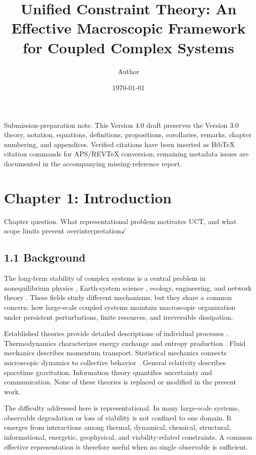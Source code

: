 \documentclass[aps,pre,reprint,superscriptaddress,nofootinbib]{revtex4-2}
\begin{document}
\title{Unified Constraint Theory: An Effective Macroscopic Framework for Coupled Complex Systems}
\author{Author}
\date{\today}
\maketitle

Submission-preparation note. This Version 4.0 draft preserves the Version 3.0 theory, notation, equations, definitions, propositions, corollaries, remarks, chapter numbering, and appendices. Verified citations have been inserted as BibTeX citation commands for APS/REVTeX conversion; remaining metadata issues are documented in the accompanying missing-reference report.

\section{Chapter 1: Introduction}

Chapter question. What representational problem motivates UCT, and what scope limits prevent overinterpretation$\checkmark$

\subsection{1.1 Background}

The long-term stability of complex systems is a central problem in nonequilibrium physics \cite{NicolisPrigogine1977,Haken1977Synergetics}, Earth-system science \cite{Rockstrom2009,Steffen2015,Richardson2023}, ecology, engineering, and network theory \cite{Mitchell2009,Barabasi2016}. These fields study different mechanisms, but they share a common concern: how large-scale coupled systems maintain macroscopic organization under persistent perturbations, finite resources, and irreversible dissipation.

Established theories provide detailed descriptions of individual processes \cite{NicolisPrigogine1977,Jaynes1957I,Wilson1983RG,Goldenfeld1992}. Thermodynamics characterizes energy exchange and entropy production \cite{NicolisPrigogine1977,Jaynes1957I}. Fluid mechanics describes momentum transport. Statistical mechanics connects microscopic dynamics to collective behavior \cite{Jaynes1957I}. General relativity describes spacetime gravitation. Information theory quantifies uncertainty and communication. None of these theories is replaced or modified in the present work.

The difficulty addressed here is representational. In many large-scale systems, observable degradation or loss of viability is not confined to one domain. It emerges from interactions among thermal, dynamical, chemical, structural, informational, energetic, geophysical, and viability-related constraints. A common effective representation is therefore useful when no single observable is sufficient.
\end{document}
